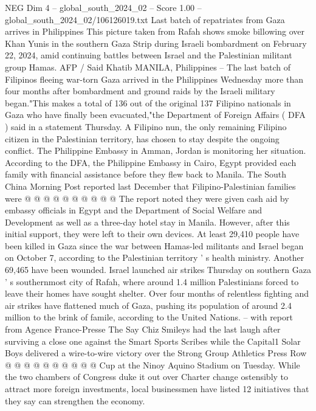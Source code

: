 \begin{textsample}{NEG Dim 4 – global\_south\_2024\_02 – Score 1.00 – global\_south\_2024\_02/106126019.txt}  \label{ex:f4_neg_389}
Last batch of repatriates from Gaza arrives in Philippines This picture taken from Rafah shows smoke billowing over Khan Yunis in the southern Gaza Strip during Israeli bombardment on February 22, 2024, amid continuing battles between Israel and the Palestinian militant group Hamas.
AFP / Said Khatib MANILA, Philippines -- The last batch of Filipinos fleeing war-torn Gaza arrived in the Philippines Wednesday more than four months after bombardment and ground raids by the Israeli military began."This makes a total of 136 out of the original 137 Filipino nationals in Gaza who have finally been evacuated,"the Department of Foreign Affairs ( DFA ) said in a statement Thursday.
A Filipino nun, the only remaining Filipino citizen in the Palestinian territory, has chosen to stay despite the ongoing conflict.
The Philippine Embassy in Amman, Jordan is monitoring her situation.
According to the DFA, the Philippine Embassy in Cairo, Egypt provided each family with financial assistance before they flew back to Manila.
The South China Morning Post reported last December that Filipino-Palestinian families were @ @ @ @ @ @ @ @ @ @ The report noted they were given cash aid by embassy officials in Egypt and the Department of Social Welfare and Development as well as a three-day hotel stay in Manila.
However, after this initial support, they were left to their own devices.
At least 29,410 people have been killed in Gaza since the war between Hamas-led militants and Israel began on October 7, according to the Palestinian territory ' s health ministry.
Another 69,465 have been wounded.
Israel launched air strikes Thursday on southern Gaza ' s southernmost city of Rafah, where around 1.4 million Palestinians forced to leave their homes have sought shelter.
Over four months of relentless fighting and air strikes have flattened much of Gaza, pushing its population of around 2.4 million to the brink of famile, according to the United Nations. -- with report from Agence France-Presse The Say Chiz Smileys had the last laugh after surviving a close one against the Smart Sports Scribes while the Capital1 Solar Boys delivered a wire-to-wire victory over the Strong Group Athletics Press Row @ @ @ @ @ @ @ @ @ @ Cup at the Ninoy Aquino Stadium on Tuesday.
While the two chambers of Congress duke it out over Charter change ostensibly to attract more foreign investments, local businessmen have listed 12 initiatives that they say can strengthen the economy.

\end{textsample}
